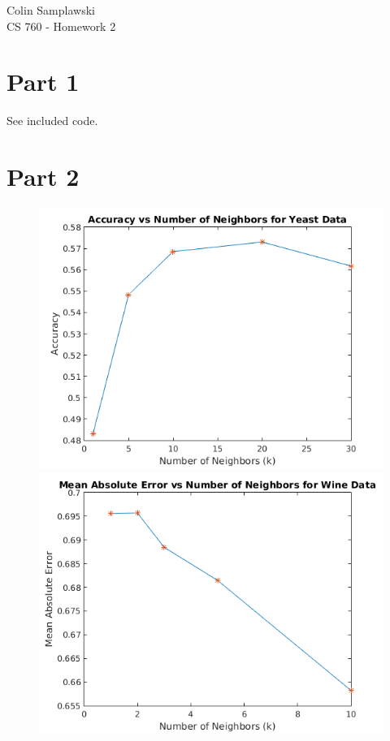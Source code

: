 \documentclass[10pt]{article}
\begin{document}
	\begin{center}
			Colin Samplawski \\
			CS 760 - Homework 2
	\end{center}
\section*{Part 1}
See included code.
\section*{Part 2}
\begin{figure}[H]
\begin{minipage}[b]{0.49\textwidth}
	\includegraphics[width=\textwidth]{y_graph.jpg}
\end{minipage}
\hfill
\begin{minipage}[b]{0.49\textwidth}
	\includegraphics[width=\textwidth]{w_graph.jpg}
\end{minipage}
\end{figure}
\end{document}
